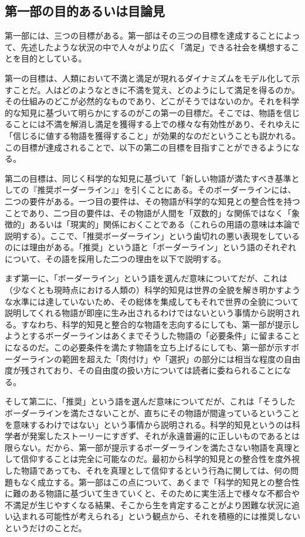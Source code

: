 \subsection{第一部の目的あるいは目論見}\label{ux7b2cux4e00ux90e8ux306eux76eeux7684ux3042ux308bux3044ux306fux76eeux8ad6ux898b}

第一部には、三つの目標がある。第一部はその三つの目標を達成することによって、先述したような状況の中で人々がより広く「満足」できる社会を構想することを目的としている。

第一の目標は、人類において不満と満足が現れるダイナミズムをモデル化して示すことだ。人はどのようなときに不満を覚え、どのようにして満足を得るのか。その仕組みのどこが必然的なものであり、どこがそうではないのか。それを科学的な知見に基づいて明らかにするのがこの第一の目標だ。そこでは、物語を信じることには不満を解消し満足を獲得する上での様々な有効性があり、それゆえに「信じるに値する物語を獲得すること」が効果的なのだということも説かれる。この目標が達成されることで、以下の第二の目標を目指すことができるようになる。

第二の目標は、同じく科学的な知見に基づいて「新しい物語が満たすべき基準としての『推奨ボーダーライン』」を引くことにある。そのボーダーラインには、二つの要件がある。一つ目の要件は、その物語が科学的な知見との整合性を持つことであり、二つ目の要件は、その物語が人間を「双数的」な関係ではなく「象徴的」あるいは「現実的」関係におくことである（これらの用語の意味は本論で説明する）。ここで、「推奨ボーダーライン」という歯切れの悪い表現をしているのには理由がある。「推奨」という語と「ボーダーライン」という語のそれぞれについて、その語を採用した二つの理由を以下で説明する。

まず第一に、「ボーダーライン」という語を選んだ意味についてだが、これは（少なくとも現時点における人類の）科学的知見は世界の全貌を解き明かすような水準には達していないため、その総体を集成してもそれで世界の全貌について説明してくれる物語が即座に生み出されるわけではないという事情から説明される。すなわち、科学的知見と整合的な物語を志向するにしても、第一部が提示しようとするボーダーラインはあくまでそうした物語の「必要条件」に留まることになるのだ。この必要条件を満たす物語を立ち上げるにしても、第一部が示すボーダーラインの範囲を超えた「肉付け」や「選択」の部分には相当な程度の自由度が残されており、その自由度の扱い方については読者に委ねられることになる。

そして第二に、「推奨」という語を選んだ意味についてだが、これは「そうしたボーダーラインを満たさないことが、直ちにその物語が間違っているということを意味するわけではない」という事情から説明される。科学的知見というのは科学者が発案したストーリーにすぎず、それが永遠普遍的に正しいものであるとは限らない。だから、第一部が提示するボーダーラインを満たさない物語を真理として信仰することは完全に可能なのだ。最初から科学的知見との整合性を度外視した物語であっても、それを真理として信仰するという行為に関しては、何の問題もなく成立する。第一部はこの点について、あくまで「科学的知見との整合性に難のある物語に基づいて生きていくと、そのために実生活上で様々な不都合や不満足が生じやすくなる結果、そこから生を肯定することがより困難な状況に追い込まれる可能性が考えられる」という観点から、それを積極的には推奨しないというだけのことだ。


